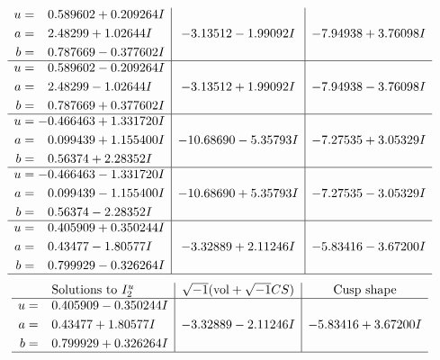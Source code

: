\documentclass[1p]{elsarticle_modified}
\theoremstyle{definition}
\newcommand{\I}{\sqrt{-1}}
\begin{document}
$$\begin{array}{c|c|c}
\begin{aligned}
u &= \phantom{-}0.589602 + 0.209264 I \\
a &= \phantom{-}2.48299 + 1.02644 I \\
b &= \phantom{-}0.787669 - 0.377602 I\end{aligned}
 & -3.13512 - 1.99092 I & -7.94938 + 3.76098 I \\ \hline\begin{aligned}
u &= \phantom{-}0.589602 - 0.209264 I \\
a &= \phantom{-}2.48299 - 1.02644 I \\
b &= \phantom{-}0.787669 + 0.377602 I\end{aligned}
 & -3.13512 + 1.99092 I & -7.94938 - 3.76098 I \\ \hline\begin{aligned}
u &= -0.466463 + 1.331720 I \\
a &= \phantom{-}0.099439 + 1.155400 I \\
b &= \phantom{-}0.56374 + 2.28352 I\end{aligned}
 & -10.68690 - 5.35793 I & -7.27535 + 3.05329 I \\ \hline\begin{aligned}
u &= -0.466463 - 1.331720 I \\
a &= \phantom{-}0.099439 - 1.155400 I \\
b &= \phantom{-}0.56374 - 2.28352 I\end{aligned}
 & -10.68690 + 5.35793 I & -7.27535 - 3.05329 I \\ \hline\begin{aligned}
u &= \phantom{-}0.405909 + 0.350244 I \\
a &= \phantom{-}0.43477 - 1.80577 I \\
b &= \phantom{-}0.799929 - 0.326264 I\end{aligned}
 & -3.32889 + 2.11246 I & -5.83416 - 3.67200 I\\
 \hline 
 \end{array}$$\newpage$$\begin{array}{c|c|c}  
\text{Solutions to }I^u_{2}& \I (\text{vol} + \sqrt{-1}CS) & \text{Cusp shape}\\
 \hline 
\begin{aligned}
u &= \phantom{-}0.405909 - 0.350244 I \\
a &= \phantom{-}0.43477 + 1.80577 I \\
b &= \phantom{-}0.799929 + 0.326264 I\end{aligned}
 & -3.32889 - 2.11246 I & -5.83416 + 3.67200 I\\
 \hline 
 \end{array}$$\newpage
\end{document}
